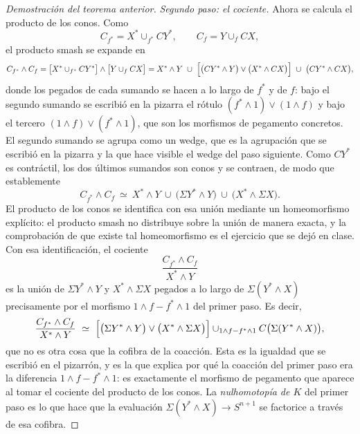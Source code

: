 \begin{proof}[Demostración del teorema anterior]
\emph{Segundo paso: el cociente.} Ahora se calcula el producto de los conos. Como
\[
C_{f^*}=X^*\cup_{f^*}CY^* ,
\qquad
C_f=Y\cup_fCX ,
\]
el producto smash se expande en
\[
C_{f^*}\wedge C_f
=\bigl[X^*\cup_{f^*}CY^*\bigr]\wedge\bigl[Y\cup_fCX\bigr]
=
X^*\wedge Y\ \cup\ \Bigl[\bigl(CY^*\wedge Y\bigr)\vee\bigl(X^*\wedge CX\bigr)\Bigr]\ \cup\ \bigl(CY^*\wedge CX\bigr),
\]
donde los pegados de cada sumando se hacen a lo largo de $f^*$ y de $f$: bajo el segundo sumando se escribió en la pizarra el rótulo $(f^*\wedge1)\vee(1\wedge f)$ y bajo el tercero $(1\wedge f)\vee(f^*\wedge1)$, que son los morfismos de pegamento concretos. El segundo sumando se agrupa como un wedge, que es la agrupación que se escribió en la pizarra y la que hace visible el wedge del paso siguiente. Como $CY^*$ es contráctil, los dos últimos sumandos son conos y se contraen, de modo que establemente
\[
C_{f^*}\wedge C_f\ \simeq\ X^*\wedge Y\ \cup\ \bigl(\Sigma Y^*\wedge Y\bigr)\ \cup\ \bigl(X^*\wedge\Sigma X\bigr).
\]
El producto de los conos se identifica con esa unión mediante un homeomorfismo explícito: el producto smash no distribuye sobre la unión de manera exacta, y la comprobación de que existe tal homeomorfismo es el ejercicio que se dejó en clase. Con esa identificación, el cociente
\[
\frac{C_{f^*}\wedge C_f}{X^*\wedge Y}
\]
es la unión de $\Sigma Y^*\wedge Y$ y $X^*\wedge\Sigma X$ pegados a lo largo de $\Sigma(Y^*\wedge X)$ precisamente por el morfismo $1\wedge f-f^*\wedge1$ del primer paso. Es decir,
\[
\frac{C_{f^*}\wedge C_f}{X^*\wedge Y}\ \simeq\ \Bigl[\bigl(\Sigma Y^*\wedge Y\bigr)\vee\bigl(X^*\wedge\Sigma X\bigr)\Bigr]\cup_{1\wedge f-f^*\wedge1}C\bigl(\Sigma(Y^*\wedge X)\bigr),
\]
que no es otra cosa que la cofibra de la coacción. Esta es la igualdad que se escribió en el pizarrón, y es la que explica por qué la coacción del primer paso era la diferencia $1\wedge f-f^*\wedge1$: es exactamente el morfismo de pegamento que aparece al tomar el cociente del producto de los conos. La \emph{nulhomotopía de $K$} del primer paso es lo que hace que la evaluación $\Sigma(Y^*\wedge X)\to S^{n+1}$ se factorice a través de esa cofibra.


\end{proof}
